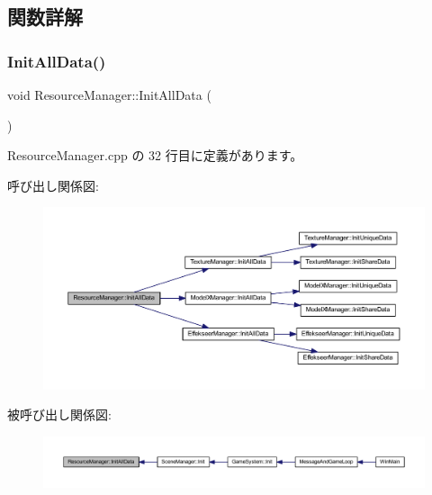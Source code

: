 \subsection{関数詳解}
\mbox{\label{class_resource_manager_aa91dc794c10825768c5d85e69342632b}} 
\subsubsection{\texorpdfstring{Init\+All\+Data()}{InitAllData()}}
{\footnotesize\ttfamily void Resource\+Manager\+::\+Init\+All\+Data (\begin{DoxyParamCaption}{ }\end{DoxyParamCaption})\hspace{0.3cm}{\ttfamily [static]}}



 Resource\+Manager.\+cpp の 32 行目に定義があります。

呼び出し関係図\+:\nopagebreak
\begin{figure}[H]
\begin{center}
\leavevmode
\includegraphics[width=350pt]{class_resource_manager_aa91dc794c10825768c5d85e69342632b_cgraph}
\end{center}
\end{figure}
被呼び出し関係図\+:
\nopagebreak
\begin{figure}[H]
\begin{center}
\leavevmode
\includegraphics[width=350pt]{class_resource_manager_aa91dc794c10825768c5d85e69342632b_icgraph}
\end{center}
\end{figure}
\mbox{\label{class_resource_manager_af9be166f96250b01b9070a262cdb5d34}} 
